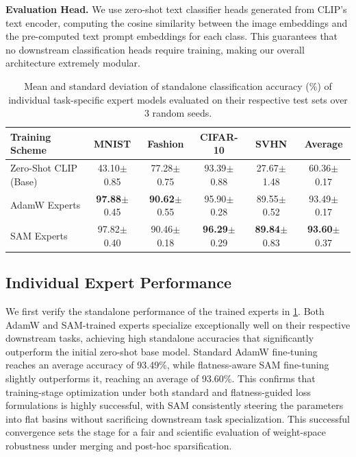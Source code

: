 \textbf{Evaluation Head.} We use zero-shot text classifier heads generated from CLIP's text encoder, computing the cosine similarity between the image embeddings and the pre-computed text prompt embeddings for each class. This guarantees that no downstream classification heads require training, making our overall architecture extremely modular.

\begin{table}[t]
\caption{Mean and standard deviation of standalone classification accuracy (\%) of individual task-specific expert models evaluated on their respective test sets over 3 random seeds.}
\label{tab:expert_accuracies}
\vskip 0.15in
\centering
\small
\begin{tabular}{lccccc}
\toprule
\textbf{Training Scheme} & \textbf{MNIST} & \textbf{Fashion} & \textbf{CIFAR-10} & \textbf{SVHN} & \textbf{Average} \\
\midrule
Zero-Shot CLIP (Base) & 43.10$\pm$0.85 & 77.28$\pm$0.75 & 93.39$\pm$0.88 & 27.67$\pm$1.48 & 60.36$\pm$0.17 \\
AdamW Experts & \textbf{97.88}$\pm$0.45 & \textbf{90.62}$\pm$0.55 & 95.90$\pm$0.28 & 89.55$\pm$0.52 & 93.49$\pm$0.17 \\
SAM Experts & 97.82$\pm$0.40 & 90.46$\pm$0.18 & \textbf{96.29}$\pm$0.29 & \textbf{89.84}$\pm$0.83 & \textbf{93.60}$\pm$0.37 \\
\bottomrule
\end{tabular}
\end{table}

\subsection{Individual Expert Performance}
We first verify the standalone performance of the trained experts in \cref{tab:expert_accuracies}. Both AdamW and SAM-trained experts specialize exceptionally well on their respective downstream tasks, achieving high standalone accuracies that significantly outperform the initial zero-shot base model. Standard AdamW fine-tuning reaches an average accuracy of 93.49\%, while flatness-aware SAM fine-tuning slightly outperforms it, reaching an average of 93.60\%. This confirms that training-stage optimization under both standard and flatness-guided loss formulations is highly successful, with SAM consistently steering the parameters into flat basins without sacrificing downstream task specialization. This successful convergence sets the stage for a fair and scientific evaluation of weight-space robustness under merging and post-hoc sparsification.

